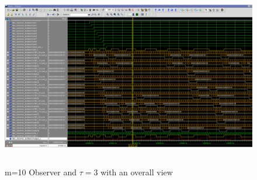 \begin{figure}[h]
\centering
\includegraphics[width=650px,height=300px,angle=-90]{../../pictures/Modelsim/10_Observer_tb_3.png}
\caption[Modelsim Simulation of 10 Observer - 3]{m=10 Observer and $\tau=3$ with an overall view}
\label{fig:simulation:ten:third}
\end{figure}
